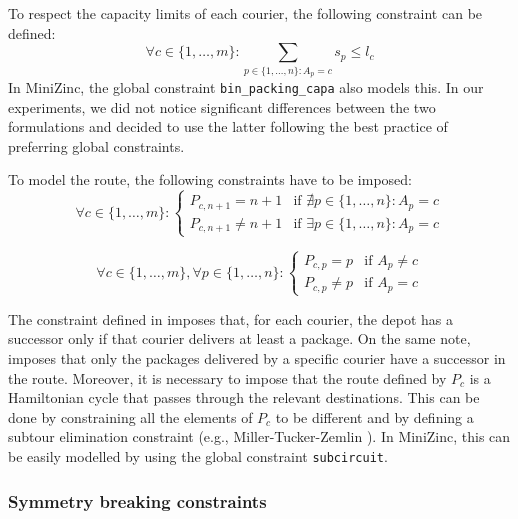 To respect the capacity limits of each courier, the following constraint can be defined:
\begin{equation}
    \forall c \in \{ 1, \dots, m \}: \sum_{p \in \{1, \dots, n\}: A_p = c} s_p \leq l_c 
\end{equation}
In MiniZinc, the global constraint \texttt{bin\_packing\_capa} also models this. In our experiments, we did not notice significant differences between the two formulations and decided to use the latter following the best practice of preferring global constraints.

To model the route, the following constraints have to be imposed:
\begin{equation}
    \label{eq:cp_constr_route_depot}
    \forall c \in \{ 1, \dots, m \}: 
    \begin{cases}
        P_{c, n+1} = n+1    & \text{if $\nexists p \in \{ 1, \dots, n \}: A_p = c$} \\ 
        P_{c, n+1} \neq n+1 & \text{if $\exists p \in \{ 1, \dots, n \}: A_p = c$} 
    \end{cases}
\end{equation}

\begin{equation}
    \label{eq:cp_constr_route_packs}
    \forall c \in \{ 1, \dots, m \},
    \forall p \in \{ 1, \dots, n \}: 
    \begin{cases}
        P_{c, p} = p    & \text{if $A_p \neq c$} \\
        P_{c, p} \neq p & \text{if $A_p = c$} 
    \end{cases}
\end{equation}

The constraint defined in  imposes that, for each courier, the depot has a successor only if that courier delivers at least a package. On the same note,  imposes that only the packages delivered by a specific courier have a successor in the route.
Moreover, it is necessary to impose that the route defined by $P_c$ is a Hamiltonian cycle that passes through the relevant destinations. This can be done by constraining all the elements of $P_c$ to be different and by defining a subtour elimination constraint (e.g., Miller-Tucker-Zemlin \cite{mtz_subtour}). In MiniZinc, this can be easily modelled by using the global constraint \texttt{subcircuit}.


\subsubsection{Symmetry breaking constraints}

